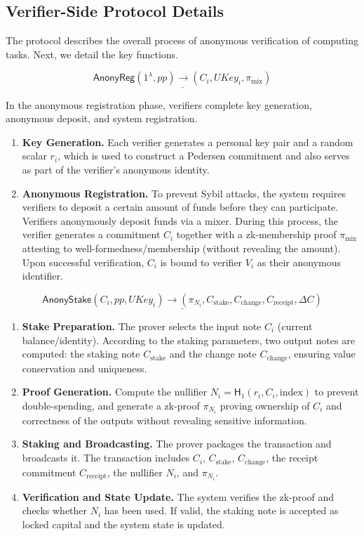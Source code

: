 \documentclass[3p]{elsarticle}
\theoremstyle{remark}
\newcommand{\hash}{\mathsf{H}}
\begin{document}
\subsection{ Verifier-Side Protocol Details }

The protocol describes the overall process of anonymous verification of computing tasks. Next, we detail the key functions.

\[
\underline{ \mathsf{AnonyReg}(1^\lambda, pp) \rightarrow (C_i, UKey_i, \pi_{\text{mix}}) }
\]

In the anonymous registration phase, verifiers complete key generation, anonymous deposit, and system registration.

\begin{enumerate}[label=(\arabic*)]
    \item \textbf{Key Generation.}
    Each verifier generates a personal key pair and a random scalar $r_i$, which is used to construct a Pedersen commitment and also serves as part of the verifier’s anonymous identity.
    \item \textbf{Anonymous Registration.}
    To prevent Sybil attacks, the system requires verifiers to deposit a certain amount of funds before they can participate. Verifiers anonymously deposit funds via a mixer. During this process, the verifier generates a commitment $C_i$ together with a zk-membership proof $\pi_{\text{mix}}$ attesting to well-formedness/membership (without revealing the amount). Upon successful verification, $C_i$ is bound to verifier $V_i$ as their anonymous identifier.

\end{enumerate}

\[
\underline{ \mathsf{AnonyStake}(C_i, pp, UKey_i) \rightarrow (\pi_{N_i}, C_{\text{stake}}, C_{\text{change}}, C_{\text{receipt}}, \Delta C) }
\]

\begin{enumerate}[label=(\arabic*)]
    \item \textbf{Stake Preparation.}
    The prover selects the input note \( C_i \) (current balance/identity). According to the staking parameters, two output notes are computed: the staking note \( C_{\text{stake}} \) and the change note \( C_{\text{change}} \), ensuring value conservation and uniqueness.
    \item \textbf{Proof Generation.}
    Compute the nullifier \( N_i=\hash_1(r_i, C_i, \text{index}) \) to prevent double-spending, and generate a zk-proof \( \pi_{N_i} \) proving ownership of \( C_i \) and correctness of the outputs without revealing sensitive information.
    \item \textbf{Staking and Broadcasting.}
    The prover packages the transaction and broadcasts it. The transaction includes \( C_i \), \( C_{\text{stake}} \), \( C_{\text{change}} \), the receipt commitment \( C_{\text{receipt}} \), the nullifier \( N_i \), and \( \pi_{N_i} \).
    \item \textbf{Verification and State Update.}
    The system verifies the zk-proof and checks whether \( N_i \) has been used. If valid, the staking note is accepted as locked capital and the system state is updated.
\end{enumerate}
\end{document}
